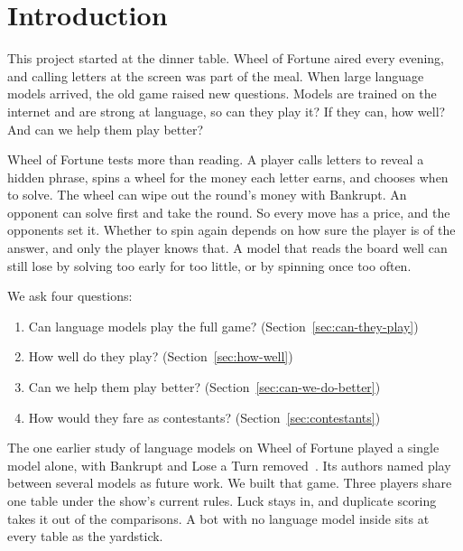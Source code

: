 \section{Introduction}\label{sec:introduction}

This project started at the dinner table. Wheel of Fortune aired every evening, and calling letters at the screen was part of the meal. When large language models arrived, the old game raised new questions. Models are trained on the internet and are strong at language, so can they play it? If they can, how well? And can we help them play better?

Wheel of Fortune tests more than reading. A player calls letters to reveal a hidden phrase, spins a wheel for the money each letter earns, and chooses when to solve. The wheel can wipe out the round's money with Bankrupt. An opponent can solve first and take the round. So every move has a price, and the opponents set it. Whether to spin again depends on how sure the player is of the answer, and only the player knows that. A model that reads the board well can still lose by solving too early for too little, or by spinning once too often.

We ask four questions:
\begin{enumerate}
  \item Can language models play the full game? (Section~\ref{sec:can-they-play})
  \item How well do they play? (Section~\ref{sec:how-well})
  \item Can we help them play better? (Section~\ref{sec:can-we-do-better})
  \item How would they fare as contestants? (Section~\ref{sec:contestants})
\end{enumerate}

The one earlier study of language models on Wheel of Fortune played a single model alone, with Bankrupt and Lose a Turn removed~\citep{llmike}. Its authors named play between several models as future work. We built that game. Three players share one table under the show's current rules. Luck stays in, and duplicate scoring takes it out of the comparisons. A bot with no language model inside sits at every table as the yardstick.

